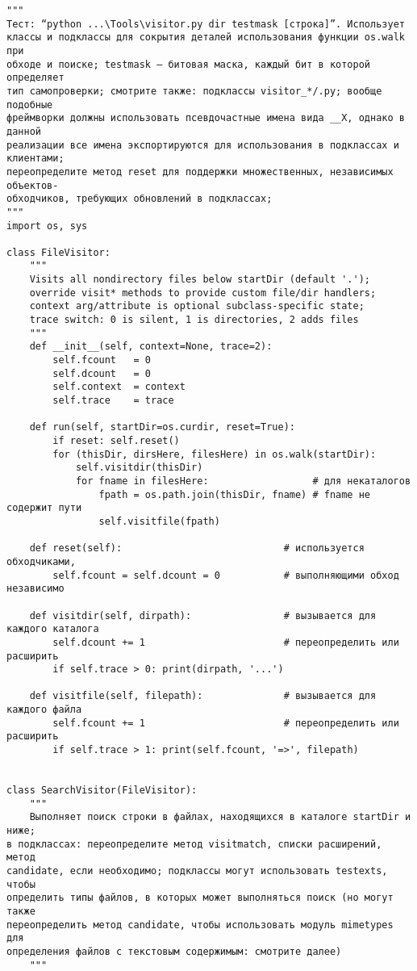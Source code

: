 \documentclass[12pt]{article}
\begin{document}
\begin{verbatim}
"""
Тест: “python ...\Tools\visitor.py dir testmask [строка]”. Использует
классы и подклассы для сокрытия деталей использования функции os.walk при
обходе и поиске; testmask – битовая маска, каждый бит в которой определяет
тип самопроверки; смотрите также: подклассы visitor_*/.py; вообще подобные
фреймворки должны использовать псевдочастные имена вида __X, однако в данной
реализации все имена экспортируются для использования в подклассах и клиентами;
переопределите метод reset для поддержки множественных, независимых объектов-
обходчиков, требующих обновлений в подклассах;
"""
import os, sys

class FileVisitor:
    """
    Visits all nondirectory files below startDir (default '.');
    override visit* methods to provide custom file/dir handlers;
    context arg/attribute is optional subclass-specific state;
    trace switch: 0 is silent, 1 is directories, 2 adds files
    """
    def __init__(self, context=None, trace=2):
        self.fcount   = 0
        self.dcount   = 0
        self.context  = context
        self.trace    = trace

    def run(self, startDir=os.curdir, reset=True):
        if reset: self.reset()
        for (thisDir, dirsHere, filesHere) in os.walk(startDir):
            self.visitdir(thisDir)
            for fname in filesHere:                  # для некаталогов
                fpath = os.path.join(thisDir, fname) # fname не содержит пути
                self.visitfile(fpath)
 
    def reset(self):                            # используется обходчиками,
        self.fcount = self.dcount = 0           # выполняющими обход независимо

    def visitdir(self, dirpath):                # вызывается для каждого каталога
        self.dcount += 1                        # переопределить или расширить
        if self.trace > 0: print(dirpath, '...')

    def visitfile(self, filepath):              # вызывается для каждого файла
        self.fcount += 1                        # переопределить или расширить
        if self.trace > 1: print(self.fcount, '=>', filepath)


class SearchVisitor(FileVisitor):
    """
    Выполняет поиск строки в файлах, находящихся в каталоге startDir и ниже;
в подклассах: переопределите метод visitmatch, списки расширений, метод
candidate, если необходимо; подклассы могут использовать testexts, чтобы
определить типы файлов, в которых может выполняться поиск (но могут также
переопределить метод candidate, чтобы использовать модуль mimetypes для
определения файлов с текстовым содержимым: смотрите далее)
    """


\end{verbatim}
\end{document}
